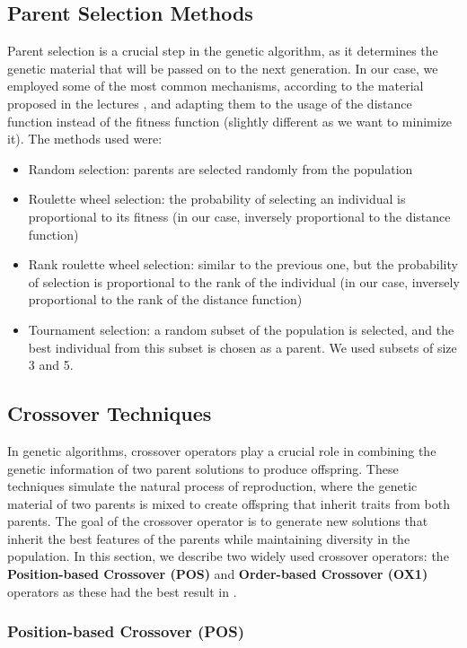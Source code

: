\documentclass[11pt]{article}
\begin{document}
\subsection{Parent Selection Methods}
Parent selection is a crucial step in the genetic algorithm, as it determines the genetic material that will be passed on to the next generation. In our case, we employed some of the most common mechanisms, according to the material proposed in the lectures \cite{Belanche2024}, and adapting them to the usage of the distance function instead of the fitness function (slightly different as we want to minimize it). The methods used were:
\begin{itemize}
    \item Random selection: parents are selected randomly from the population
    \item Roulette wheel selection: the probability of selecting an individual is proportional to its fitness (in our case, inversely proportional to the distance function)
    \item Rank roulette wheel selection: similar to the previous one, but the probability of selection is proportional to the rank of the individual (in our case, inversely proportional to the rank of the distance function)
    \item Tournament selection: a random subset of the population is selected, and the best individual from this subset is chosen as a parent. We used subsets of size 3 and 5.
\end{itemize}


\subsection{Crossover Techniques}

In genetic algorithms, crossover operators play a crucial role in combining the genetic information of two parent solutions to produce offspring. These techniques simulate the natural process of reproduction, where the genetic material of two parents is mixed to create offspring that inherit traits from both parents. The goal of the crossover operator is to generate new solutions that inherit the best features of the parents while maintaining diversity in the population. In this section, we describe two widely used crossover operators: the \textbf{Position-based Crossover (POS)} and \textbf{Order-based Crossover (OX1)} operators as these had the best result in \cite{Larranaga1999}.

\subsubsection{Position-based Crossover (POS)}
\end{document}
